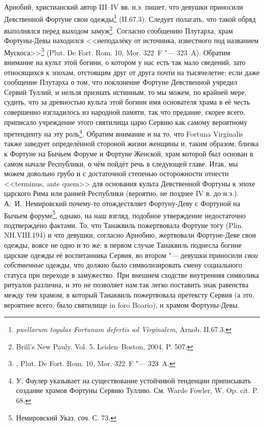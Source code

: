 Арнобий, христианский автор III--IV вв. н.э. пишет, что девушки приносили Девственной Фортуне свои одежды\footnote{\textit{puellarum togulas Fortunam defertis ad Virginalem}, Arnob. II.67.3.} (II.67.3). Следует полагать, что такой обряд выполнялся перед выходом замуж\footnote{Brill's New Pauly. Vol. 5. Leiden--Boston, 2004. P. 507.}. Согласно сообщению Плутарха, храм Фортуны-Девы находился <<неподалёку от источника, известного под названием Мускоса>>\footnote{, Plut. De Fort. Rom. 10, Mor. 322~F "--- 323~A.} (Plut. De Fort. Rom. 10, Mor. 322~F "--- 323~A). Обратим внимание на культ этой богини, о котором у нас есть так мало сведений, зато относящихся к эпохам, отстоящим друг от друга почти на тысячелетие: если даже сообщение Плутарха о том, что поклонение Фортуне Девственной учредил Сервий Туллий, и нельзя признать истинным, то мы можем, по крайней мере, судить, что за древностью культа этой богини имя основателя храма в её честь совершенно изгладилось из народной памяти, так что предание, скорее всего, приписало учреждение этого святилища царю Сервию как самому вероятному претенденту на эту роль\footnote{У. Фаулер указывает на существование устойчивой тенденции приписывать создание храмов Фортуны Сервию Туллию. См. Warde Fowler, W. Op. cit. P. 68.}. Обратим внимание и на то, что Fortuna Virginalis также заведует определённой стороной жизни женщины и, таким образом, близка к Фортуне на Бычьем Форуме и Фортуне Женской, храм которой был основан в самом начале Республики, о чём пойдёт речь в следующей главе. Итак, мы можем довольно грубо и с достаточной степенью осторожности отнести <<terminus, ante quem>> для основания культа Девственной Фортуны к эпохе царского Рима или ранней Республики (вероятно, не позднее IV в. до н.э.). А.~И.~Немировский почему-то отождествляет Фортуну-Деву с Фортуной на Бычьем форуме\footnote{Немировский Указ. соч. С. 73.}, однако, на наш взгляд, подобное утверждение недостаточно подтверждено фактами. То, что Танаквиль пожертвовала Фортуне тогу (Plin. NH.VIII.194) и что девушки, согласно Арнобию, жертвовали Фортуне-Деве свои одежды, вовсе не одно и то же: в первом случае Танаквиль поднесла богине царские одежды её воспитанника Сервия, во втором "--- девушки приносили \textit{свои собственные} одежды, что должно было символизировать смену социального статуса при переходе в замужество. При внешнем сходстве внутренняя символика ритуалов различна, и это не позволяет нам так легко поставить знак равенства между тем храмом, в который Танаквиль пожертвовала претексту Сервия (а это, вероятнее всего, было святилище in foro Boario), и храмом Фортуны-Девы.

